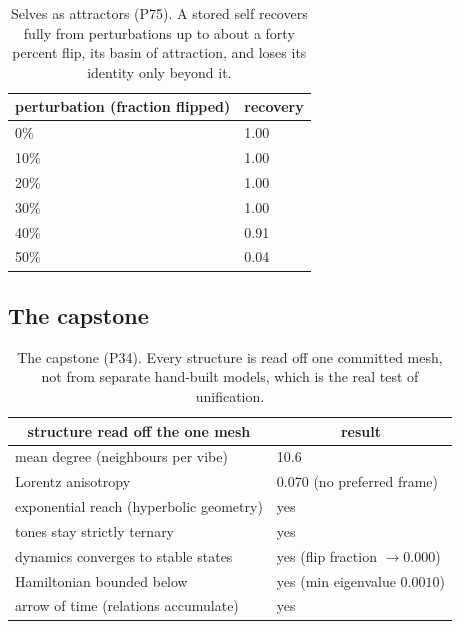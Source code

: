 \begin{table}[H]
\centering
\small
\begin{tabular}{ll}
\toprule
\multicolumn{1}{c}{perturbation (fraction flipped)} & \multicolumn{1}{c}{recovery} \\
\midrule
0\% & 1.00 \\
10\% & 1.00 \\
20\% & 1.00 \\
30\% & 1.00 \\
40\% & 0.91 \\
50\% & 0.04 \\
\bottomrule
\end{tabular}
\caption{Selves as attractors (P75). A stored self recovers fully from perturbations up to about a forty percent flip, its basin of attraction, and loses its identity only beyond it.}
\end{table}

\subsection{The capstone}

\begin{table}[H]
\centering
\small
\begin{tabular}{ll}
\toprule
\multicolumn{1}{c}{structure read off the one mesh} & \multicolumn{1}{c}{result} \\
\midrule
mean degree (neighbours per vibe) & 10.6 \\
Lorentz anisotropy & 0.070 (no preferred frame) \\
exponential reach (hyperbolic geometry) & yes \\
tones stay strictly ternary & yes \\
dynamics converges to stable states & yes (flip fraction $\to 0.000$) \\
Hamiltonian bounded below & yes (min eigenvalue $0.0010$) \\
arrow of time (relations accumulate) & yes \\
\bottomrule
\end{tabular}
\caption{The capstone (P34). Every structure is read off one committed mesh, not from separate hand-built models, which is the real test of unification.}
\end{table}

